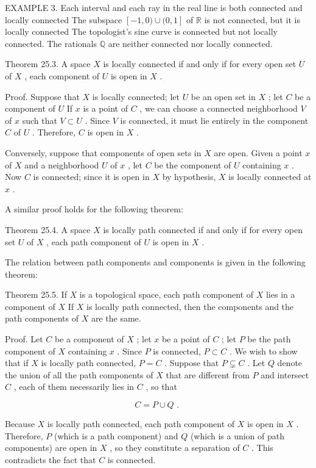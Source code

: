 \documentclass[10pt]{article}
\begin{document}
EXAMPLE 3. Each interval and each ray in the real line is both connected and locally connected The subspace \(\left\lbrack  {-1,0)\cup (0,1}\right\rbrack\) of \(\mathbb{R}\) is not connected, but it is locally connected The topologist’s sine curve is connected but not locally connected. The rationals \(\mathbb{Q}\) are neither connected nor locally connected.

Theorem 25.3. A space \(X\) is locally connected if and only if for every open set \(U\) of \(X\) , each component of \(U\) is open in \(X\) .

Proof. Suppose that \(X\) is locally connected; let \(U\) be an open set in \(X\) ; let \(C\) be a component of \(U\) If \(x\) is a point of \(C\) , we can choose a connected neighborhood \(V\) of \(x\) such that \(V \subset  U\) . Since \(V\) is connected, it must lie entirely in the component \(C\) of \(U\) . Therefore, \(C\) is open in \(X\) .

Conversely, suppose that components of open sets in \(X\) are open. Given a point \(x\) of \(X\) and a neighborhood \(U\) of \(x\) , let \(C\) be the component of \(U\) containing \(x\) . Now \(C\) is connected; since it is open in \(X\) by hypothesis, \(X\) is locally connected at \(x\) .

A similar proof holds for the following theorem:

Theorem 25.4. A space \(X\) is locally path connected if and only if for every open set \(U\) of \(X\) , each path component of \(U\) is open in \(X\) .

The relation between path components and components is given in the following theorem:

Theorem 25.5. If \(X\) is a topological space, each path component of \(X\) lies in a component of \(X\) If \(X\) is locally path connected, then the components and the path components of \(X\) are the same.

Proof. Let \(C\) be a component of \(X\) ; let \(x\) be a point of \(C\) ; let \(P\) be the path component of \(X\) containing \(x\) . Since \(P\) is connected, \(P \subset  C\) . We wish to show that if \(X\) is locally path connected, \(P = C\) . Suppose that \(P \varsubsetneq  C\) . Let \(Q\) denote the union of all the path components of \(X\) that are different from \(P\) and intersect \(C\) , each of them necessarily lies in \(C\) , so that

\[
C = P \cup  Q\text{ . }
\]

Because \(X\) is locally path connected, each path component of \(X\) is open in \(X\) . Therefore, \(P\) (which is a path component) and \(Q\) (which is a union of path components) are open in \(X\) , so they constitute a separation of \(C\) . This contradicts the fact that \(C\) is connected.
\end{document}
